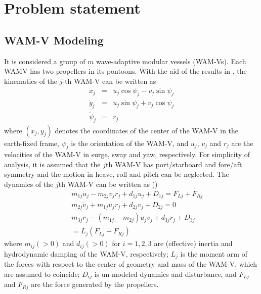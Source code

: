 \documentclass[letterpaper, 10 pt, conference]{ieeeconf}  %
\begin{document}
\section{Problem statement }
\label{sec2}


\subsection{WAM-V Modeling}
\label{model}

It is considered a group of $m$ wave-adaptive modular vessels (WAM-Vs). Each WAMV has  two propellers in its pontoons. With the aid of the results in \cite{fos94},
the kinematics of the $j$-th WAM-V can be written as
\begin{eqnarray}
\dot{x}_j&=&u_j\cos\psi_j  -v_j\sin\psi_j \label{e1a}\\
\dot{y}_j&=&u_j\sin\psi_j +v_j\cos\psi_j \label{e1b}\\
\dot{\psi}_j&=&r_j \label{e1c}
\end{eqnarray}
where $(x_j, y_j)$ denotes the coordinates of the center of the WAM-V in the earth-fixed frame, $\psi_j$ is the
orientation of the WAM-V, and $u_j$, $v_j$ and $r_j$ are the
velocities of the WAM-V in surge, sway and yaw,
respectively.  For simplicity of analysis, it is assumed that the $j$th WAM-V has port/starboard and fore/aft symmetry and the motion in heave, roll and pitch can be neglected. The dynamics of the $j$th WAM-V can be
written as (\cite{fos94})
\begin{eqnarray}
&&m_{1j}\dot{u}_j-m_{2j}v_jr_j+
d_{1j}u_j+D_{1j}=F_{Lj}+F_{Rj} \label{e2a}\\
&&m_{2j}\dot{v}_j+m_{1j}u_jr_j+d_{2j}v_j+D_{2j}=0 \label{e2b}\\
&&m_{3j}\dot{r}_j-(m_{1j}-m_{2j})u_jv_j+d_{3j}r_j+D_{3j}\nonumber\\
&&=
L_j(F_{Lj}-F_{Rj})
 \label{e2c}
\end{eqnarray}
where $m_{ij}(>0)$  and $d_{ij}(>0)$  for $i=1,2,3$ are (effective)
 inertia and  hydrodynamic damping of the WAM-V,
respectively; $L_j$ is the moment arm of the forces with respect to the center of geometry and mass of the WAM-V, which are assumed to coincide; $D_{ij}$ is un-modeled dynamics and disturbance, and $F_{Lj}$ and $F_{Rj}$ are the force generated by the propellers. 
\end{document}
